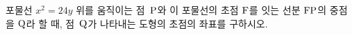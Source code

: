포물선 $x^2=24y$ 위를 움직이는 점~$\mathrm{P}$와 이 포물선의 초점 $\mathrm{F}$를 잇는 선분 $\mathrm{FP}$의 중점을 $\mathrm{Q}$라 할 때, 점~$\mathrm{Q}$가 나타내는 도형의 초점의 좌표를 구하시오.
